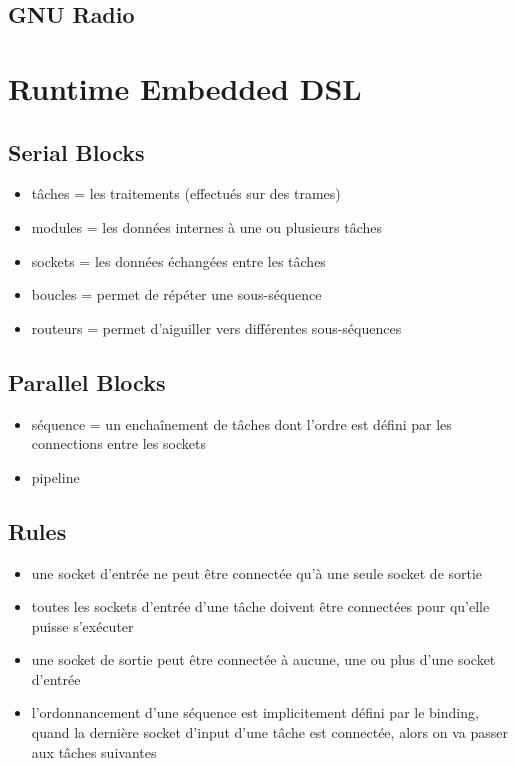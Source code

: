 \subsection{GNU Radio}

\section{Runtime Embedded DSL}

\subsection{Serial Blocks}

\begin{itemize}
  \item tâches = les traitements (effectués sur des trames)
  \item modules = les données internes à une ou plusieurs tâches
  \item sockets = les données échangées entre les tâches
  \item boucles = permet de répéter une sous-séquence
  \item routeurs = permet d'aiguiller vers différentes sous-séquences
\end{itemize}

\subsection{Parallel Blocks}

\begin{itemize}
  \item séquence = un enchaînement de tâches dont l'ordre est défini par les
        connections entre les sockets
  \item pipeline
\end{itemize}

\subsection{Rules}

\begin{itemize}
  \item une socket d'entrée ne peut être connectée qu'à une seule socket de
    sortie
  \item toutes les sockets d'entrée d'une tâche doivent être connectées pour
    qu'elle puisse s'exécuter
  \item une socket de sortie peut être connectée à aucune, une ou plus d'une
    socket d'entrée
  \item l'ordonnancement d'une séquence est implicitement défini par le binding,
    quand la dernière socket d'input d'une tâche est connectée, alors on va
    passer aux tâches suivantes
\end{itemize}


